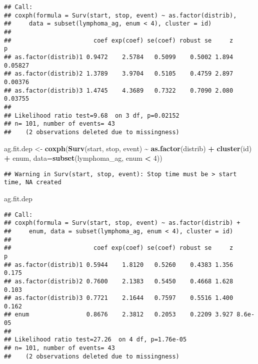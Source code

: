 \documentclass[
]{article}
\newenvironment{Shaded}{\begin{snugshade}}{\end{snugshade}}
\newcommand{\AttributeTok}[1]{\textcolor[rgb]{0.13,0.29,0.53}{#1}}
\newcommand{\DecValTok}[1]{\textcolor[rgb]{0.00,0.00,0.81}{#1}}
\newcommand{\FunctionTok}[1]{\textcolor[rgb]{0.13,0.29,0.53}{\textbf{#1}}}
\newcommand{\NormalTok}[1]{#1}
\newcommand{\OtherTok}[1]{\textcolor[rgb]{0.56,0.35,0.01}{#1}}
\newcommand{\SpecialCharTok}[1]{\textcolor[rgb]{0.81,0.36,0.00}{\textbf{#1}}}
\begin{document}
\begin{verbatim}
## Call:
## coxph(formula = Surv(start, stop, event) ~ as.factor(distrib), 
##     data = subset(lymphoma_ag, enum < 4), cluster = id)
## 
##                       coef exp(coef) se(coef) robust se     z       p
## as.factor(distrib)1 0.9472    2.5784   0.5099    0.5002 1.894 0.05827
## as.factor(distrib)2 1.3789    3.9704   0.5105    0.4759 2.897 0.00376
## as.factor(distrib)3 1.4745    4.3689   0.7322    0.7090 2.080 0.03755
## 
## Likelihood ratio test=9.68  on 3 df, p=0.02152
## n= 101, number of events= 43 
##    (2 observations deleted due to missingness)
\end{verbatim}

\begin{Shaded}
\begin{Highlighting}[]
\NormalTok{ag.fit.dep }\OtherTok{\textless{}{-}} \FunctionTok{coxph}\NormalTok{(}\FunctionTok{Surv}\NormalTok{(start, stop, event) }\SpecialCharTok{\textasciitilde{}} \FunctionTok{as.factor}\NormalTok{(distrib) }\SpecialCharTok{+} \FunctionTok{cluster}\NormalTok{(id) }\SpecialCharTok{+}\NormalTok{ enum, }\AttributeTok{data=}\FunctionTok{subset}\NormalTok{(lymphoma\_ag, enum }\SpecialCharTok{\textless{}} \DecValTok{4}\NormalTok{))}
\end{Highlighting}
\end{Shaded}

\begin{verbatim}
## Warning in Surv(start, stop, event): Stop time must be > start time, NA created
\end{verbatim}

\begin{Shaded}
\begin{Highlighting}[]
\NormalTok{ag.fit.dep}
\end{Highlighting}
\end{Shaded}

\begin{verbatim}
## Call:
## coxph(formula = Surv(start, stop, event) ~ as.factor(distrib) + 
##     enum, data = subset(lymphoma_ag, enum < 4), cluster = id)
## 
##                       coef exp(coef) se(coef) robust se     z       p
## as.factor(distrib)1 0.5944    1.8120   0.5260    0.4383 1.356   0.175
## as.factor(distrib)2 0.7600    2.1383   0.5450    0.4668 1.628   0.103
## as.factor(distrib)3 0.7721    2.1644   0.7597    0.5516 1.400   0.162
## enum                0.8676    2.3812   0.2053    0.2209 3.927 8.6e-05
## 
## Likelihood ratio test=27.26  on 4 df, p=1.76e-05
## n= 101, number of events= 43 
##    (2 observations deleted due to missingness)
\end{verbatim}
\end{document}
